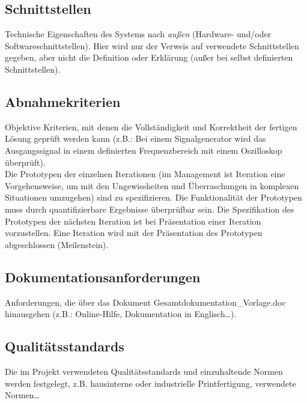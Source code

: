 \documentclass[12pt,a4paper]{article}
\newcommand{\yhbu}[0]{\color{ydkbu}}	%
\begin{document}
{ \subsection{Schnittstellen}
	{\yhbu
	Technische Eigenschaften des Systems nach {\em außen}
	(Hardware- und\slash{}oder Softwareschnittstellen).
	Hier wird nur der Verweis auf verwendete Schnittstellen gegeben,
	aber nicht die Definition oder Erklärung
	(außer bei selbst definierten Schnittstellen).
	}

 \subsection{Abnahmekriterien}
	{\yhbu
	Objektive Kriterien,
	mit denen die Vollständigkeit und Korrektheit
	der fertigen Lösung geprüft werden kann
	(z.B.: Bei einem Signalgenerator wird das Ausgangssignal
	in einem definierten Frequenzbereich mit einem Oszilloskop überprüft).
	\\[1mm]
	Die Prototypen der einzelnen Iterationen
	(im Management ist Iteration eine Vorgehensweise,
	um mit den Ungewissheiten und Überraschungen in komplexen Situationen umzugehen)
	sind zu spezifizieren.
	Die Funktionalität der Prototypen muss durch quantifizierbare Ergebnisse überprüfbar sein.
	Die Spezifikation des Prototypen der nächsten Iteration
	ist bei Präsentation einer Iteration vorzustellen.
	Eine Iteration wird mit der Präsentation des Prototypen abgeschlossen (Meilenstein).
	}

 \subsection{Dokumentationsanforderungen}
	{\yhbu
	Anforderungen, die über das Dokument
	\dq{}Gesamtdokumentation\_Vorlage.doc\dq{} hinausgehen
	(z.B.: Online-Hilfe, Dokumentation in Englisch\ldots).
	}

 \subsection{Qualitätsstandards}
	{\yhbu
	Die im Projekt verwendeten Qualitätsstandards und einzuhaltende Normen
	werden festgelegt,
	z.B. hausinterne oder industrielle Printfertigung, verwendete Normen\ldots
	}

}
\end{document}
